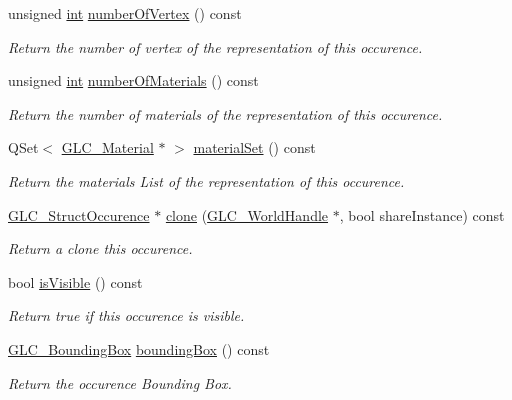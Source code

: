 \begin{DoxyCompactItemize}
unsigned \hyperlink{ioapi_8h_a787fa3cf048117ba7123753c1e74fcd6}{int} \hyperlink{class_g_l_c___struct_occurence_a71d91e11f5e6060ff1a8a9aa9262e942}{number\-Of\-Vertex} () const 
\begin{DoxyCompactList}\small\item\em Return the number of vertex of the representation of this occurence. \end{DoxyCompactList}\item 
unsigned \hyperlink{ioapi_8h_a787fa3cf048117ba7123753c1e74fcd6}{int} \hyperlink{class_g_l_c___struct_occurence_a9cad989073e6d196de9a2525c837b4b4}{number\-Of\-Materials} () const 
\begin{DoxyCompactList}\small\item\em Return the number of materials of the representation of this occurence. \end{DoxyCompactList}\item 
Q\-Set$<$ \hyperlink{class_g_l_c___material}{G\-L\-C\-\_\-\-Material} $\ast$ $>$ \hyperlink{class_g_l_c___struct_occurence_a57e600d783c759b969f1d3fb3b25bcdd}{material\-Set} () const 
\begin{DoxyCompactList}\small\item\em Return the materials List of the representation of this occurence. \end{DoxyCompactList}\item 
\hyperlink{class_g_l_c___struct_occurence}{G\-L\-C\-\_\-\-Struct\-Occurence} $\ast$ \hyperlink{class_g_l_c___struct_occurence_af0f50ff139eb266f0f34069485a12be6}{clone} (\hyperlink{class_g_l_c___world_handle}{G\-L\-C\-\_\-\-World\-Handle} $\ast$, bool share\-Instance) const 
\begin{DoxyCompactList}\small\item\em Return a clone this occurence. \end{DoxyCompactList}\item 
bool \hyperlink{class_g_l_c___struct_occurence_a87b3e8023cc509e78cc87e27a6264302}{is\-Visible} () const 
\begin{DoxyCompactList}\small\item\em Return true if this occurence is visible. \end{DoxyCompactList}\item 
\hyperlink{class_g_l_c___bounding_box}{G\-L\-C\-\_\-\-Bounding\-Box} \hyperlink{class_g_l_c___struct_occurence_a4064b362e69171d825269eb80d53aaee}{bounding\-Box} () const 
\begin{DoxyCompactList}\small\item\em Return the occurence Bounding Box. \end{DoxyCompactList}\item 

\end{DoxyCompactItemize}
